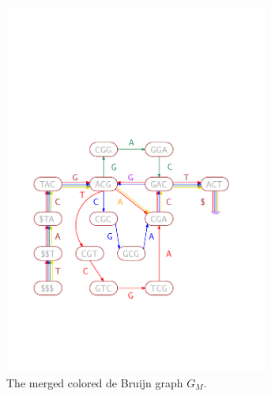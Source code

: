 \begin{figure}[h!]
\begin{subfigure}[c]{0.5\textwidth}
        \includegraphics[width=0.95\textwidth]{browngraph.pdf}       
        \caption{The merged colored de Bruijn graph $G_M$.}
        \label{fig:g2}
    \end{subfigure}
\begin{subfigure}[c]{0.5\textwidth}

\end{subfigure}
\end{figure}
